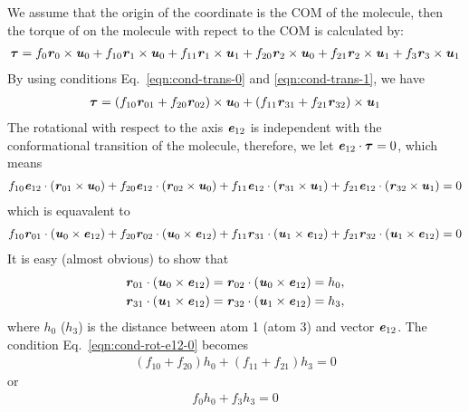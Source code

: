 \documentclass[aip,jcp,a4paper,reprint,onecolumn]{revtex4-1}
\newcommand{\vect}[1]{\textbf{\textit{#1}}}
\begin{document}
We assume that the origin of the coordinate is the COM of the
molecule, then the torque of on the molecule with repect to the COM is
calculated by:
\begin{align}
  \boldsymbol\tau
  =
  f_0 \vect r_0\times \vect u_0 + 
  f_{10} \vect r_1\times \vect u_0 + 
  f_{11} \vect r_1\times \vect u_1 + 
  f_{20} \vect r_2\times \vect u_0 + 
  f_{21} \vect r_2\times \vect u_1 + 
  f_3 \vect r_3\times \vect u_1 
\end{align}
By using conditions Eq.~\eqref{eqn:cond-trans-0} and
\eqref{eqn:cond-trans-1}, we have
\begin{align}
  \boldsymbol\tau =
  (f_{10}\vect r_{01} + f_{20} \vect r_{02})\times \vect u_0 +
  (f_{11}\vect r_{31} + f_{21} \vect r_{32})\times \vect u_1
\end{align}
The rotational with respect to the axis $\vect e_{12}$ is independent with
the conformational transition of the molecule, therefore, we let
$\vect e_{12}\cdot \boldsymbol\tau  = 0$, which means
\begin{align}
  f_{10} \vect e_{12}\cdot(\vect r_{01}\times\vect u_0) + 
  f_{20} \vect e_{12}\cdot(\vect r_{02}\times\vect u_0) + 
  f_{11} \vect e_{12}\cdot(\vect r_{31}\times\vect u_1) + 
  f_{21} \vect e_{12}\cdot(\vect r_{32}\times\vect u_1)  = 0
\end{align}
which is equavalent to
\begin{align}\label{eqn:cond-rot-e12-0}
  f_{10} \vect r_{01}\cdot(\vect u_0\times\vect e_{12}) + 
  f_{20} \vect r_{02}\cdot(\vect u_0\times\vect e_{12}) + 
  f_{11} \vect r_{31}\cdot(\vect u_1\times\vect e_{12}) + 
  f_{21} \vect r_{32}\cdot(\vect u_1\times\vect e_{12}) = 0
\end{align}
It is easy (almost obvious) to show that
\begin{align}
  \vect r_{01}\cdot(\vect u_0\times\vect e_{12}) = \vect r_{02}\cdot(\vect u_0\times\vect e_{12}) & = h_0, \\
  \vect r_{31}\cdot(\vect u_1\times\vect e_{12}) = \vect r_{32}\cdot(\vect u_1\times\vect e_{12}) & = h_3,
\end{align}
where $h_0$ ($h_3$) is the distance between atom 1 (atom 3) and vector
$\vect e_{12}$. The condition Eq.~\eqref{eqn:cond-rot-e12-0} becomes
\begin{align}\label{eqn:tmp49}
  (f_{10} + f_{20}) h_0 + (f_{11} + f_{21}) h_3 = 0
\end{align}
or
\begin{align}
  f_0h_0 + f_3h_3 = 0
\end{align}
\end{document}
